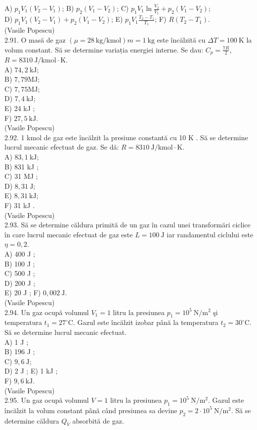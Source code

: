 A) $p_{1} V_{1}\left(V_{2}-V_{1}\right)$; B) $p_{2}\left(V_{1}-V_{2}\right)$; C) $p_{1} V_{1} \ln \frac{V_{2}}{V_{1}}+p_{2}\left(V_{1}-V_{2}\right)$;\\
D) $p_{1} V_{1}\left(V_{2}-V_{1}\right)+p_{2}\left(V_{1}-V_{2}\right)$; E) $p_{1} V_{1} \frac{T_{2}-T_{1}}{T_{1}}$; F) $R\left(T_{2}-T_{1}\right)$.\\
(Vasile Popescu)\\
2.91. O masă de gaz $(\mu=28 \mathrm{~kg} / \mathrm{kmol}) m=1 \mathrm{~kg}$ este încălzită cu $\Delta T=100 \mathrm{~K}$ la volum constant. Să se determine variația energiei interne. Se dau: $C_{p}=\frac{7 R}{2}$, $R=8310 \mathrm{~J} / \mathrm{kmol} \cdot \mathrm{K}$.\\
A) $74,2 \mathrm{~kJ}$;\\
B) $7,79 \mathrm{MJ}$;\\
C) $7,75 \mathrm{MJ}$;\\
D) $7,4 \mathrm{~kJ}$;\\
E) 24 kJ ;\\
F) $27,5 \mathrm{~kJ}$.\\
(Vasile Popescu)\\
2.92. 1 kmol de gaz este încălzit la presiune constantă cu 10 K . Să se determine lucrul mecanic efectuat de gaz. Se dă: $R=8310 \mathrm{~J} / \mathrm{kmol} \cdot \mathrm{K}$.\\
A) $83,1 \mathrm{~kJ}$;\\
B) 831 kJ ;\\
C) 31 MJ ;\\
D) $8,31 \mathrm{~J}$;\\
E) $8,31 \mathrm{~kJ}$;\\
F) 31 kJ .\\
(Vasile Popescu)\\
2.93. Să se determine căldura primită de un gaz în cazul unei transformări ciclice în care lucrul mecanic efectuat de gaz este $L=100 \mathrm{~J}$ iar randamentul ciclului este $\eta=0,2$.\\
A) 400 J ;\\
B) 100 J ;\\
C) 500 J ;\\
D) 200 J ;\\
E) 20 J ; F) $0,002 \mathrm{~J}$.\\
(Vasile Popescu)\\
2.94. Un gaz ocupă volumul $V_{1}=1$ litru la presiunea $p_{1}=10^{5} \mathrm{~N} / \mathrm{m}^{2}$ şi temperatura $t_{1}=27^{\circ} \mathrm{C}$. Gazul este încălzit izobar până la temperatura $t_{2}=30^{\circ} \mathrm{C}$. Să se determine lucrul mecanic efectuat.\\
A) 1 J ;\\
B) 196 J ;\\
C) $9,6 \mathrm{~J}$;\\
D) 2 J ; E) 1 kJ ;\\
F) $9,6 \mathrm{~kJ}$.\\
(Vasile Popescu)\\
2.95. Un gaz ocupă volumul $V=1$ litru la presiunea $p_{1}=10^{5} \mathrm{~N} / \mathrm{m}^{2}$. Gazul este încălzit la volum constant până când presiunea sa devine $p_{2}=2 \cdot 10^{5} \mathrm{~N} / \mathrm{m}^{2}$. Să se determine căldura $Q_{V}$ absorbită de gaz.

